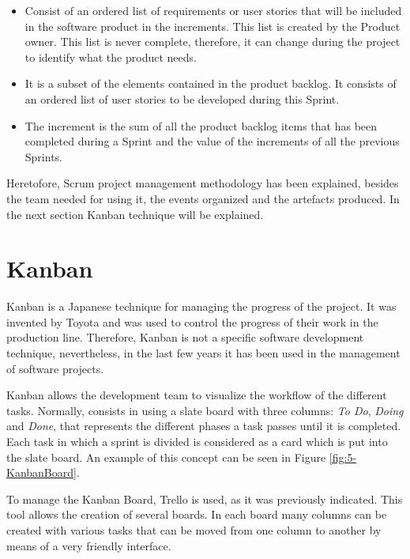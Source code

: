 \begin{itemize}
	\item {} Consist of an ordered list of requirements or user stories that will be included in the software product in the increments. This list is created by the Product owner. This list is never complete, therefore, it can change during the project to identify what the product needs. 
	
	\item {} It is a subset of the elements contained in the product backlog. It consists of an ordered list of user stories to be developed during this Sprint.
	
	\item {} The increment is the sum of all the product backlog items that has been completed during a Sprint and the value of the increments of all the previous Sprints.
\end{itemize}

Heretofore, Scrum project management methodology has been explained, besides the team needed for using it, the events organized and the artefacts produced. In the next section Kanban technique will be explained.


\section{Kanban}

Kanban \cite{Gar11,KS10} is a Japanese technique for managing the progress of the project. It was invented by Toyota and was used to control the progress of their work in the production line. Therefore, Kanban is not a specific software development technique, nevertheless, in the last few years it has been used in the management of software projects.

Kanban allows the development team to visualize the workflow of the different tasks. Normally, consists in using a slate board with three columns: \emph{To Do}, \emph{Doing} and \emph{Done}, that represents the different phases a task passes until it is completed. Each task in which a sprint is divided is considered as a card which is put into the slate board. An example of this concept can be seen in Figure \ref{fig:5-KanbanBoard}.

To manage the Kanban Board, Trello is used, as it was previously indicated. This tool allows the creation of several boards. In each board many columns can be created with various tasks that can be moved from one column to another by means of a very friendly interface.

